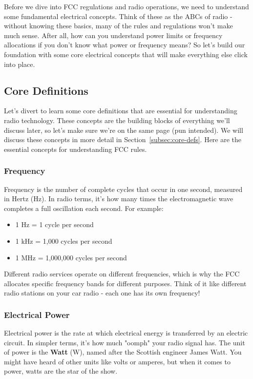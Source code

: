 Before we dive into FCC regulations and radio operations, we need to understand some fundamental electrical concepts. Think of these as the ABCs of radio - without knowing these basics, many of the rules and regulations won't make much sense. After all, how can you understand power limits or frequency allocations if you don't know what power or frequency means? So let's build our foundation with some core electrical concepts that will make everything else click into place.


\subsection{Core Definitions}
\label{subsec:minimal-core-defs}

Let's divert to learn  some core definitions that are essential for understanding radio technology. These concepts are the building blocks of everything we'll discuss later, so let's make sure we're on the same page (pun intended). We will discuss these concepts in more detail in Section~\ref{subsec:core-defs}. Here are the essential concepts for understanding FCC rules.

\subsubsection*{Frequency}
Frequency is the number of complete cycles that occur in one second, measured in Hertz (Hz). In radio terms, it's how many times the electromagnetic wave completes a full oscillation each second. For example:
\begin{itemize}[noitemsep]
    \item 1 Hz = 1 cycle per second
    \item 1 kHz = 1,000 cycles per second
    \item 1 MHz = 1,000,000 cycles per second
\end{itemize}

Different radio services operate on different frequencies, which is why the FCC allocates specific frequency bands for different purposes. Think of it like different radio stations on your car radio - each one has its own frequency!

\subsubsection*{Electrical Power}
Electrical power is the rate at which electrical energy is transferred by an electric circuit. In simpler terms, it's how much "oomph" your radio signal has. The unit of power is the \textbf{Watt} (W), named after the Scottish engineer James Watt. You might have heard of other units like volts or amperes, but when it comes to power, watts are the star of the show. 

